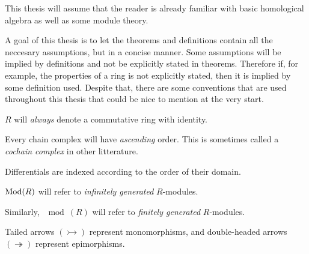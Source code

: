 This thesis will assume that the reader is already familiar with basic homological algebra as well as some module theory.

A goal of this thesis is to let the theorems and definitions contain all the neccesary assumptions, but in a concise manner. Some assumptions will be implied by definitions and not be explicitly stated in theorems. Therefore if, for example, the properties of a ring is not explicitly stated, then it is implied by some definition used. Despite that, there are some conventions that are used throughout this thesis that could be nice to mention at the very start.

\begin{notation}
    \( R \) will \emph{always} denote a commutative ring with identity.
\end{notation}

\begin{notation}
    \label{not:chain_complex}
    Every chain complex will have \emph{ascending} order. This is sometimes called a \emph{cochain complex} in other litterature.

    Differentials are indexed according to the order of their domain.
\end{notation}

\begin{notation}
    \( \operatorname{Mod}(R) \) will refer to \emph{infinitely generated} \( R \)-modules.

    Similarly, \( \mod(R) \) will refer to \emph{finitely generated} \( R \)-modules.
\end{notation}

\begin{notation}
    Tailed arrows \( (\rightarrowtail) \) represent monomorphisms, and double-headed arrows \( (\twoheadrightarrow) \) represent epimorphisms.
\end{notation}

